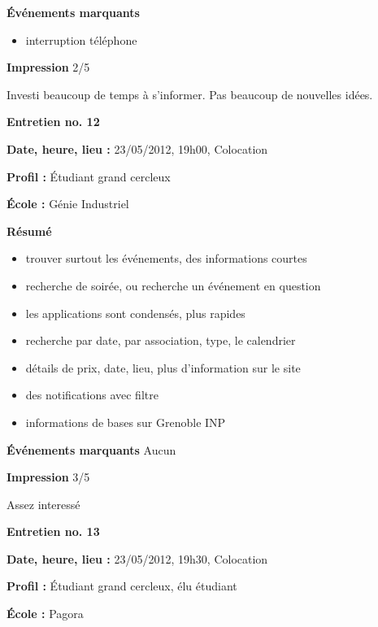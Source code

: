\documentclass[a4paper, 11px]{article}
\begin{document}
\vspace{.25cm}
\textbf{Événements marquants}
	\begin{itemize}
		\item interruption téléphone
	\end{itemize}

\vspace{.25cm}
\textbf{Impression}
2/5

Investi beaucoup de temps à s'informer. Pas beaucoup de nouvelles idées.



\vspace{.3cm}

 \textbf {\large Entretien no. 12}

\textbf{Date, heure, lieu : }
23/05/2012, 19h00, Colocation

\textbf{Profil : }
Étudiant grand cercleux

\textbf{École : }
Génie Industriel

\textbf{Résumé}
	\begin{itemize}
		\item trouver surtout les événements, des informations courtes
		\item recherche de soirée, ou recherche un événement en question
		\item les applications sont condensés, plus rapides
		\item recherche par date, par association, type, le calendrier
		\item détails de prix, date, lieu, plus d'information sur le site
		\item des notifications avec filtre
		\item informations de bases sur Grenoble INP
	\end{itemize}

\textbf{Événements marquants}
Aucun

\textbf{Impression}
3/5

Assez interessé


\vspace{.3cm}

 \textbf {\large Entretien no. 13}


\textbf{Date, heure, lieu : }
23/05/2012, 19h30, Colocation

\textbf{Profil : }
Étudiant grand cercleux, élu étudiant

\textbf{École : }
Pagora
\end{document}
